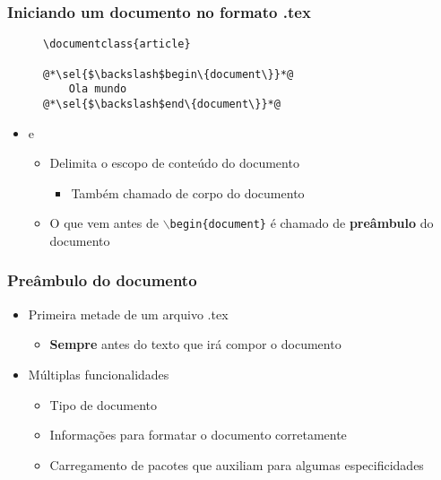 \begin{frame}[fragile] \frametitle{Iniciando um documento no formato .tex}
\begin{figure}[!t]
\begin{lstlisting}
\documentclass{article}

@*\sel{$\backslash$begin\{document\}}*@
	Ola mundo
@*\sel{$\backslash$end\{document\}}*@
\end{lstlisting}
\end{figure}

\begin{itemize}
	\item {} e 
	\begin{itemize}
		\item Delimita o escopo de conteúdo do documento
		\begin{itemize}
			\item Também chamado de corpo do documento
		\end{itemize}
		\item O que vem antes de \texttt{$\backslash$begin\{document\}} é chamado de \textbf{preâmbulo} do documento
	\end{itemize}
\end{itemize}
\end{frame}

\begin{frame} \frametitle{Preâmbulo do documento}
\begin{itemize}
	\item Primeira metade de um arquivo .tex
	\begin{itemize}
		\item \textbf{Sempre} antes do texto que irá compor o documento
	\end{itemize}
	\item Múltiplas funcionalidades
	\begin{itemize}
		\item Tipo de documento
		\item Informações para formatar o documento corretamente
		\item Carregamento de pacotes que auxiliam para algumas especificidades
	\end{itemize}
\end{itemize}
\end{frame}

